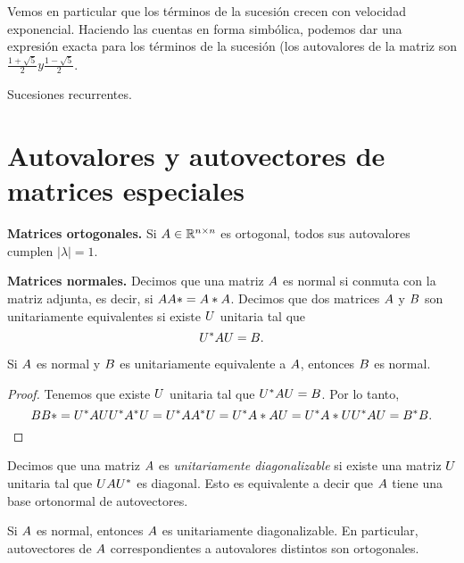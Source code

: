 Vemos en particular que los términos de la sucesión crecen con velocidad exponencial. Haciendo las cuentas en forma simbólica, podemos dar una expresión exacta para los términos de la sucesión (los autovalores de la matriz son $\frac{1+\sqrt{5}}{2} y \frac{1-\sqrt{5}}{2}$.











Sucesiones recurrentes.




\section{Autovalores y autovectores de matrices especiales}

\textbf{Matrices ortogonales.} Si $\Ab \in \R^{n \times n}$ es ortogonal,
    todos sus autovalores cumplen $|\lambda| = 1$.

\textbf{Matrices normales.}
Decimos que una matriz $\Ab$ es normal si conmuta con la matriz adjunta, es decir, si $\Ab \Ab* = \Ab* \Ab$.
Decimos que dos matrices $\Ab$ y $\Bb$ son unitariamente equivalentes si existe $\Ub$ unitaria tal que
$$
\Ub^* \Ab \Ub = \Bb.
$$

\begin{prop}
Si $\Ab$ es normal y $\Bb$ es unitariamente equivalente a $\Ab$, entonces $\Bb$ es normal.
\end{prop}
\begin{proof}
Tenemos que existe $\Ub$ unitaria tal que $\Ub^* \Ab \Ub = \Bb$. Por lo tanto,
$$
\Bb \Bb* = \Ub^* \Ab \Ub \Ub^* \Ab^* \Ub = \Ub^* \Ab \Ab^* \Ub = \Ub^* \Ab* \Ab \Ub = \Ub^* \Ab* \Ub \Ub^* \Ab \Ub = \Bb^* \Bb.
$$
\end{proof}

Decimos que una matriz $\Ab$ es \emph{unitariamente diagonalizable} si existe una matriz $\Ub$ unitaria tal que $\Ub \Ab \Ub^*$ es diagonal. Esto es equivalente a decir que $\Ab$ tiene una base ortonormal de autovectores.

\begin{prop}
Si $\Ab$ es normal, entonces $\Ab$ es unitariamente diagonalizable. En particular, autovectores de $\Ab$ correspondientes a autovalores distintos son ortogonales.
\end{prop}

